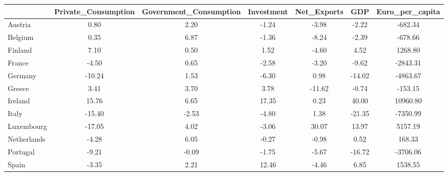\begin{table}[htbp]
\begin{tabular}{lcccccc} \hline \hline
 & Private_Consumption  & Government_Consumption  & Investment  & Net_Exports  & GDP  & Euro_per_capita  \\  \hline 
Austria &      0.80 &      2.20 &     -1.24 &     -3.98 &     -2.22 &   -682.34 \\  
Belgium &      0.35 &      6.87 &     -1.36 &     -8.24 &     -2.39 &   -678.66 \\  
Finland &      7.10 &      0.50 &      1.52 &     -4.60 &      4.52 &   1268.80 \\  
France &     -4.50 &      0.65 &     -2.58 &     -3.20 &     -9.62 &  -2843.31 \\  
Germany &    -10.24 &      1.53 &     -6.30 &      0.98 &    -14.02 &  -4863.67 \\  
Greece &      3.41 &      3.70 &      3.78 &    -11.62 &     -0.74 &   -153.15 \\  
Ireland &     15.76 &      6.65 &     17.35 &      0.23 &     40.00 &  10960.80 \\  
Italy &    -15.40 &     -2.53 &     -4.80 &      1.38 &    -21.35 &  -7350.99 \\  
Luxembourg &    -17.05 &      4.02 &     -3.06 &     30.07 &     13.97 &   5157.19 \\  
Netherlands &     -4.28 &      6.05 &     -0.27 &     -0.98 &      0.52 &    168.33 \\  
Portugal &     -9.21 &     -0.09 &     -1.75 &     -5.67 &    -16.72 &  -3706.06 \\  
Spain &     -3.35 &      2.21 &     12.46 &     -4.46 &      6.85 &   1538.55 \\  
\hline \hline \end{tabular}
\end{table}
